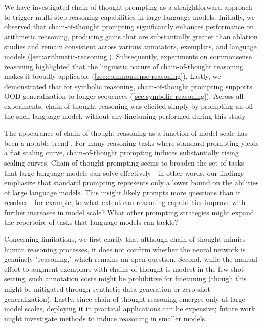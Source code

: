We have investigated chain-of-thought prompting as a straightforward approach to trigger multi-step reasoning capabilities in large language models. Initially, we observed that chain-of-thought prompting significantly enhances performance on arithmetic reasoning, producing gains that are substantially greater than ablation studies and remain consistent across various annotators, exemplars, and language models (\cref{sec:arithmetic-reasoning}). Subsequently, experiments on commonsense reasoning highlighted that the linguistic nature of chain-of-thought reasoning makes it broadly applicable (\cref{sec:commonsense-reasoning}). Lastly, we demonstrated that for symbolic reasoning, chain-of-thought prompting supports OOD generalization to longer sequences (\cref{sec:symbolic-reasoning}). Across all experiments, chain-of-thought reasoning was elicited simply by prompting an off-the-shelf language model, without any finetuning performed during this study.

The appearance of chain-of-thought reasoning as a function of model scale has been a notable trend \citep{wei2022emergent}. For many reasoning tasks where standard prompting yields a flat scaling curve, chain-of-thought prompting induces substantially rising scaling curves. Chain-of-thought prompting seems to broaden the set of tasks that large language models can solve effectively—in other words, our findings emphasize that standard prompting represents only a lower bound on the abilities of large language models. This insight likely prompts more questions than it resolves—for example, to what extent can reasoning capabilities improve with further increases in model scale? What other prompting strategies might expand the repertoire of tasks that language models can tackle?

Concerning limitations, we first clarify that although chain-of-thought mimics human reasoning processes, it does not confirm whether the neural network is genuinely "reasoning," which remains an open question. Second, while the manual effort to augment exemplars with chains of thought is modest in the few-shot setting, such annotation costs might be prohibitive for finetuning (though this might be mitigated through synthetic data generation or zero-shot generalization).  Lastly, since chain-of-thought reasoning emerges only at large model scales, deploying it in practical applications can be expensive; future work might investigate methods to induce reasoning in smaller models.

